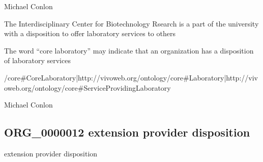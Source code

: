 \documentclass[letterpaper,10pt,english]{sphinxmanual}
\begin{document}
\begin{sphinxShadowBox}

\sphinxAtStartPar
Michael Conlon 
\end{sphinxShadowBox}

\begin{sphinxShadowBox}

\sphinxAtStartPar
The Interdisciplinary Center for Biotechnology Rsearch is a part of the university with a disposition to offer laboratory services to others
\end{sphinxShadowBox}

\begin{sphinxShadowBox}

\sphinxAtStartPar
The word “core laboratory” may indicate that an organization has a disposition of laboratory services
\end{sphinxShadowBox}

\begin{sphinxShadowBox}

\sphinxAtStartPar
{}/core\#CoreLaboratory|http://vivoweb.org/ontology/core\#Laboratory|http://vivoweb.org/ontology/core\#ServiceProvidingLaboratory
\end{sphinxShadowBox}

\begin{sphinxShadowBox}

\sphinxAtStartPar
Michael Conlon 
\end{sphinxShadowBox}
\begin{quote}

\ignorespaces \end{quote}


\subsection{ORG\_0000012 \sphinxhyphen{} extension provider disposition}
\label{\detokenize{doc-ORG_0000012:org-0000012-extension-provider-disposition}}\label{\detokenize{doc-ORG_0000012:index-0}}\label{\detokenize{doc-ORG_0000012::doc}}
\begin{sphinxShadowBox}

\sphinxAtStartPar
extension provider disposition
\end{sphinxShadowBox}
\end{document}
